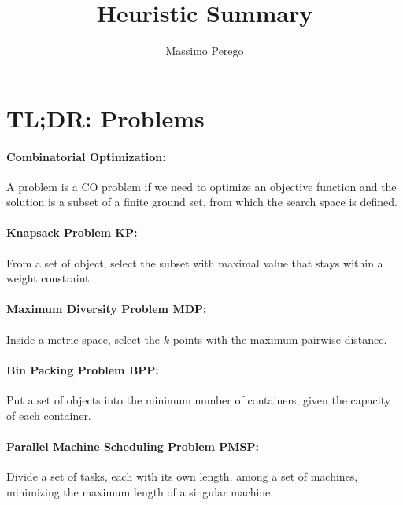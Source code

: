 \documentclass{article}
\title{Heuristic Summary}
\author{Massimo Perego}
\date{}
\begin{document}
	
	\maketitle
	
	\tableofcontents
	
	\newpage
	
	\section*{TL;DR: Problems}
	
	\paragraph{Combinatorial Optimization:} A problem is a CO problem if we need to optimize an objective function and the solution is a subset of a finite ground set, from which the search space is defined.\\
	
	\paragraph{Knapsack Problem KP:} From a set of object, select the subset with maximal value that stays within a weight constraint.\\
	
	\paragraph{Maximum Diversity Problem MDP:} Inside a metric space, select the $k$ points with the maximum pairwise distance.\\
	
	\paragraph{Bin Packing Problem BPP:} Put a set of objects into the minimum number of containers, given the capacity of each container.\\
	
	\paragraph{Parallel Machine Scheduling Problem PMSP:} Divide a set of tasks, each with its own length, among a set of machines, minimizing the maximum length of a singular machine.\\
	
\end{document}

